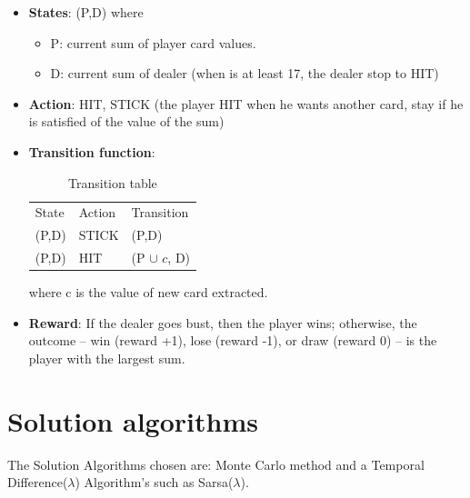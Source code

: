 \documentclass[11pt]{article}
\theoremstyle{plain}
\theoremstyle{definition}
\begin{document}
\begin{itemize}
\item \textbf{States}: (P,D) where
\begin{itemize}
\item P: current sum of player card values.
\item D: current sum of dealer (when is at least 17, the dealer stop to HIT)
\end{itemize}
\item \textbf{Action}: {HIT, STICK} (the player HIT when he wants another card, stay if he is satisfied of the value of the sum)
\item \textbf{Transition function}:
\begin{table}[h]
\centering
\caption{Transition table}
\label{my-label}
\begin{tabular}{lll}
State & Action & Transition    \\
(P,D) & STICK   & (P,D)         \\
(P,D) & HIT    & (P $\cup$ ${c}$, D)
\end{tabular}
\end{table}
where c is the value of new card extracted.
\item \textbf{Reward}:  If the dealer goes bust, then the player wins; otherwise, the outcome – win (reward +1), lose (reward -1), or draw (reward 0) – is the player with the largest sum.

 
\end{itemize}

\newpage
\section{Solution algorithms}

The Solution Algorithms chosen are: Monte Carlo method and a Temporal Difference($\lambda$) Algorithm's such as Sarsa($\lambda$).
\end{document}
